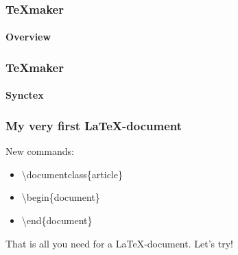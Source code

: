 
\begin{frame}
\frametitle{TeXmaker}
\framesubtitle{Overview}

\end{frame}


\begin{frame}
\frametitle{TeXmaker}
\framesubtitle{Synctex}

\end{frame}

\begin{frame}
\frametitle{My very first \LaTeX -document}
\begin{block}{New commands:}
\begin{itemize}
\item \begin{ttfamily}\color{nounibaredII}\textbackslash documentclass\color{nounibagreenI}\color{black}\{article\}\end{ttfamily}
\item \begin{ttfamily}\color{unibablueI}\textbackslash begin\color{black}\{document\}\end{ttfamily}
\item \begin{ttfamily}\color{unibablueI}\textbackslash end\color{black}\{document\}\end{ttfamily}
\end{itemize}
\end{block}
That is all you need for a \LaTeX -document. Let's try!

\end{frame}
